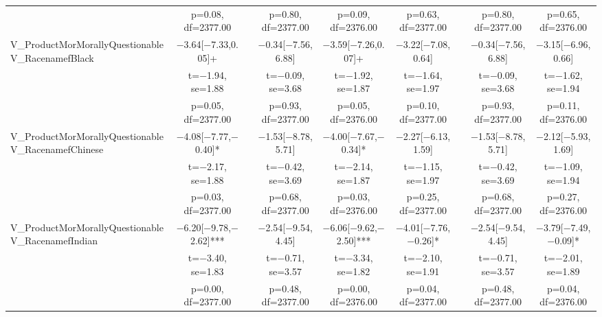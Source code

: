 \documentclass[]{report}
\begin{document}
\begin{table}
{\begin{tabular}[t]{lcccccccc}
		& p=\num{0.08}, df=\num{2377.00} &  & p=\num{0.80}, df=\num{2377.00} & p=\num{0.09}, df=\num{2376.00} & p=\num{0.63}, df=\num{2377.00} &  & p=\num{0.80}, df=\num{2377.00} & p=\num{0.65}, df=\num{2376.00}\\
		V\_ProductMorMorallyQuestionableV\_RacenamefBlack & \num{-3.64}[\num{-7.33},\num{0.05}]+ &  & \num{-0.34}[\num{-7.56},\num{6.88}] & \num{-3.59}[\num{-7.26},\num{0.07}]+ & \num{-3.22}[\num{-7.08},\num{0.64}] &  & \num{-0.34}[\num{-7.56},\num{6.88}] & \num{-3.15}[\num{-6.96},\num{0.66}]\\
		& t=\num{-1.94}, se=\num{1.88} &  & t=\num{-0.09}, se=\num{3.68} & t=\num{-1.92}, se=\num{1.87} & t=\num{-1.64}, se=\num{1.97} &  & t=\num{-0.09}, se=\num{3.68} & t=\num{-1.62}, se=\num{1.94}\\
		& p=\num{0.05}, df=\num{2377.00} &  & p=\num{0.93}, df=\num{2377.00} & p=\num{0.05}, df=\num{2376.00} & p=\num{0.10}, df=\num{2377.00} &  & p=\num{0.93}, df=\num{2377.00} & p=\num{0.11}, df=\num{2376.00}\\
		V\_ProductMorMorallyQuestionableV\_RacenamefChinese & \num{-4.08}[\num{-7.77},\num{-0.40}]* &  & \num{-1.53}[\num{-8.78},\num{5.71}] & \num{-4.00}[\num{-7.67},\num{-0.34}]* & \num{-2.27}[\num{-6.13},\num{1.59}] &  & \num{-1.53}[\num{-8.78},\num{5.71}] & \num{-2.12}[\num{-5.93},\num{1.69}]\\
		& t=\num{-2.17}, se=\num{1.88} &  & t=\num{-0.42}, se=\num{3.69} & t=\num{-2.14}, se=\num{1.87} & t=\num{-1.15}, se=\num{1.97} &  & t=\num{-0.42}, se=\num{3.69} & t=\num{-1.09}, se=\num{1.94}\\
		& p=\num{0.03}, df=\num{2377.00} &  & p=\num{0.68}, df=\num{2377.00} & p=\num{0.03}, df=\num{2376.00} & p=\num{0.25}, df=\num{2377.00} &  & p=\num{0.68}, df=\num{2377.00} & p=\num{0.27}, df=\num{2376.00}\\
		V\_ProductMorMorallyQuestionableV\_RacenamefIndian & \num{-6.20}[\num{-9.78},\num{-2.62}]*** &  & \num{-2.54}[\num{-9.54},\num{4.45}] & \num{-6.06}[\num{-9.62},\num{-2.50}]*** & \num{-4.01}[\num{-7.76},\num{-0.26}]* &  & \num{-2.54}[\num{-9.54},\num{4.45}] & \num{-3.79}[\num{-7.49},\num{-0.09}]*\\
		& t=\num{-3.40}, se=\num{1.83} &  & t=\num{-0.71}, se=\num{3.57} & t=\num{-3.34}, se=\num{1.82} & t=\num{-2.10}, se=\num{1.91} &  & t=\num{-0.71}, se=\num{3.57} & t=\num{-2.01}, se=\num{1.89}\\
		& p=\num{0.00}, df=\num{2377.00} &  & p=\num{0.48}, df=\num{2377.00} & p=\num{0.00}, df=\num{2376.00} & p=\num{0.04}, df=\num{2377.00} &  & p=\num{0.48}, df=\num{2377.00} & p=\num{0.04}, df=\num{2376.00}\\

\end{tabular}}
\end{table}
\end{document}
